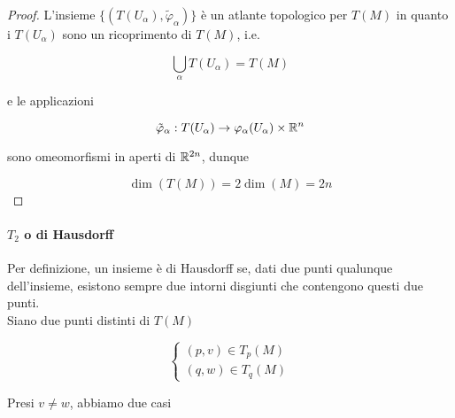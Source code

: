 \begin{proof}
	L'insieme $ \{(T(U_{\alpha}),\tilde{\varphi}_{\alpha})\} $ è un atlante topologico per $ T(M) $ in quanto i $ T(U_{\alpha}) $ sono un ricoprimento di $ T(M) $, i.e.
	
	\begin{equation}
		\bigcup_{\alpha} T(U_{\alpha}) = T(M)
	\end{equation}
	
	e le applicazioni
	
	\begin{equation}
		\tilde{\varphi}_{\alpha} : T(U_{\alpha}) \to \varphi_{\alpha}(U_{\alpha}) \times \mathbb{R}^{n}
	\end{equation}
	
	sono omeomorfismi in aperti di $ \mathbb{R}^{2n} $, dunque
	
	\begin{equation}
		\dim(T(M)) = 2 \dim(M) = 2 n
	\end{equation}
\end{proof}

\paragraph{$ T_{2} $ o di Hausdorff}

Per definizione, un insieme è di Hausdorff se, dati due punti qualunque dell'insieme, esistono sempre due intorni disgiunti che contengono questi due punti. \\
Siano due punti distinti di $ T(M) $

\begin{equation}
	\begin{cases}
		(p,v) \in T_{p}(M) \\
		(q,w) \in T_{q}(M)
	\end{cases}
\end{equation}

Presi $ v \neq w $, abbiamo due casi

